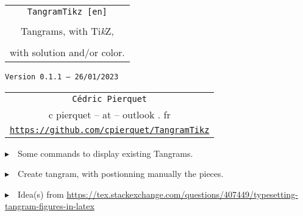 \documentclass{article}
\def\TPversion{0.1.1}
\def\TPdate{26/01/2023}
\begin{document}
\pagestyle{fancy}

\thispagestyle{empty}

\vspace{2cm}

\begin{center}
	\begin{minipage}{0.75\linewidth}
	\begin{tcolorbox}[colframe=yellow,colback=yellow!15]
		\begin{center}
			\begin{tabular}{c}
				{\Huge \texttt{TangramTikz [en]}}\\
				\\
				{\LARGE Tangrams, with Ti\textit{k}Z}, \\
				\\
				{\LARGE with solution and/or color.} \\
			\end{tabular}
			
			\medskip
			
			{\small \texttt{Version \TPversion{} -- \TPdate}}
		\end{center}
	\end{tcolorbox}
\end{minipage}
\end{center}

\vspace{0.5cm}

\begin{center}
	\begin{tabular}{c}
	\texttt{Cédric Pierquet}\\
	{\ttfamily c pierquet -- at -- outlook . fr}\\
	\texttt{\url{https://github.com/cpierquet/TangramTikz}}
\end{tabular}
\end{center}

\vspace{0.5cm}

{$\blacktriangleright$~~Some commands to display existing Tangrams.}

\smallskip

{$\blacktriangleright$~~Create tangram, with postionning manually the pieces.}

\smallskip

{$\blacktriangleright$~~Idea(s) from \url{https://tex.stackexchange.com/questions/407449/typesetting-tangram-figures-in-latex}}

\vspace{1cm}
\end{document}
